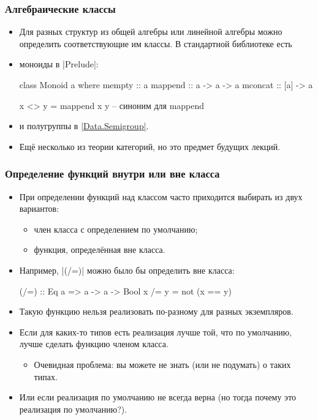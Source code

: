 \documentclass[10pt]{beamer}
\begin{document}
\begin{frame}[fragile]
  \frametitle{Алгебраические классы}
  \begin{itemize}
    \item Для разных структур из общей алгебры или линейной алгебры можно определить соответствующие им классы. В стандартной библиотеке есть
    \item моноиды в \haskinline|Prelude|:
          \begin{haskell}
            class Monoid a where
                mempty :: a
                mappend :: a -> a -> a
                mconcat :: [a] -> a
                
            x <> y = mappend x y -- синоним для mappend
          \end{haskell}
    \item и полугруппы в \href{https://hackage.haskell.org/package/base/docs/Data-Semigroup.html}{\haskinline|Data.Semigroup|}. \pause
    \item Ещё несколько из теории категорий, но это предмет будущих лекций.
  \end{itemize}
\end{frame}

\begin{frame}[fragile]
  \frametitle{Определение функций внутри или вне класса}
  \begin{itemize}
    \item При определении функций над классом часто приходится выбирать из двух вариантов:
          \begin{itemize}
            \item член класса с определением по умолчанию;
            \item функция, определённая вне класса.
          \end{itemize}
    \item Например, \haskinline|(/=)| можно было бы определить вне класса:
          \begin{haskell}
            (/=) :: Eq a => a -> a -> Bool
            x /= y = not (x == y)
          \end{haskell}
          \pause
    \item Такую функцию нельзя реализовать по-разному для разных экземпляров.\pause
    \item Если для каких-то типов есть реализация лучше той, что по умолчанию, лучше сделать функцию членом класса.
          \pause
          \begin{itemize}
            \item Очевидная проблема: вы можете не знать (или не подумать) о таких типах.
          \end{itemize}
          \pause
    \item Или если реализация по умолчанию не всегда верна \pause(но тогда почему это реализация по умолчанию?).
  \end{itemize}
\end{frame}
\end{document}
